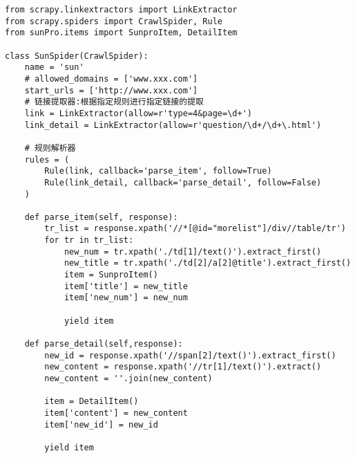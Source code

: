 \documentclass[a4paper,11pt]{ctexart}    %
\begin{document}
\begin{tcolorbox}[
         colback=red!5!white,
         colframe=teal,
         title=\textbf{main.py}
    ]
\begin{verbatim}
from scrapy.linkextractors import LinkExtractor
from scrapy.spiders import CrawlSpider, Rule
from sunPro.items import SunproItem, DetailItem

class SunSpider(CrawlSpider):
    name = 'sun'
    # allowed_domains = ['www.xxx.com']
    start_urls = ['http://www.xxx.com']
    # 链接提取器:根据指定规则进行指定链接的提取
    link = LinkExtractor(allow=r'type=4&page=\d+')
    link_detail = LinkExtractor(allow=r'question/\d+/\d+\.html')

    # 规则解析器
    rules = (
        Rule(link, callback='parse_item', follow=True)
        Rule(link_detail, callback='parse_detail', follow=False)
    )

    def parse_item(self, response):
        tr_list = response.xpath('//*[@id="morelist"]/div//table/tr')
        for tr in tr_list:
            new_num = tr.xpath('./td[1]/text()').extract_first()
            new_title = tr.xpath('./td[2]/a[2]@title').extract_first()
            item = SunproItem()
            item['title'] = new_title
            item['new_num'] = new_num

            yield item

    def parse_detail(self,response):
        new_id = response.xpath('//span[2]/text()').extract_first()
        new_content = response.xpath('//tr[1]/text()').extract()
        new_content = ''.join(new_content)

        item = DetailItem()
        item['content'] = new_content
        item['new_id'] = new_id

        yield item
\end{verbatim}
\end{tcolorbox}
\end{document}
